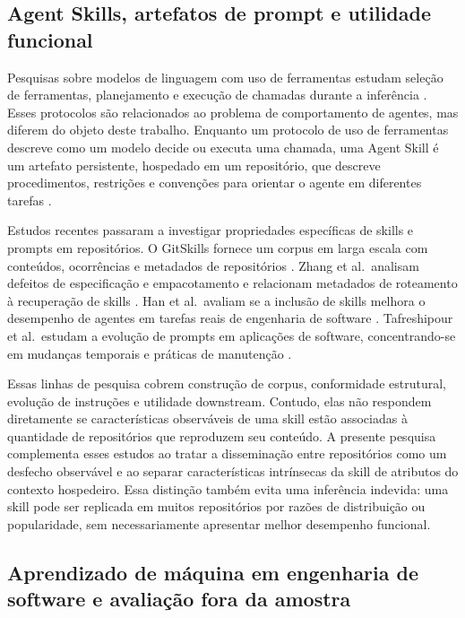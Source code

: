 \subsection{Agent Skills, artefatos de prompt e utilidade
funcional}\label{agent-skills-artefatos-de-prompt-e-utilidade-funcional}

Pesquisas sobre modelos de linguagem com uso de ferramentas estudam
seleção de ferramentas, planejamento e execução de chamadas durante a
inferência
\cite{schick2023toolformer,shen2023hugginggpt,yao2023react,qin2023toolllm}.
Esses protocolos são relacionados ao problema de comportamento de
agentes, mas diferem do objeto deste trabalho. Enquanto um protocolo de
uso de ferramentas descreve como um modelo decide ou executa uma
chamada, uma Agent Skill é um artefato persistente, hospedado em um
repositório, que descreve procedimentos, restrições e convenções para
orientar o agente em diferentes tarefas \cite{agentskills_spec}.

Estudos recentes passaram a investigar propriedades específicas de
skills e prompts em repositórios. O GitSkills fornece um corpus em larga
escala com conteúdos, ocorrências e metadados de repositórios
\cite{gitskills2027}. Zhang et al.~analisam defeitos de especificação e
empacotamento e relacionam metadados de roteamento à recuperação de
skills \cite{zhang2026keepskillsreuse}. Han et al.~avaliam se a inclusão
de skills melhora o desempenho de agentes em tarefas reais de engenharia
de software \cite{han2026sweskillsbench}. Tafreshipour et al.~estudam a
evolução de prompts em aplicações de software, concentrando-se em
mudanças temporais e práticas de manutenção
\cite{tafreshipour2025prompting}.

Essas linhas de pesquisa cobrem construção de corpus, conformidade
estrutural, evolução de instruções e utilidade downstream. Contudo, elas
não respondem diretamente se características observáveis de uma skill
estão associadas à quantidade de repositórios que reproduzem seu
conteúdo. A presente pesquisa complementa esses estudos ao tratar a
disseminação entre repositórios como um desfecho observável e ao separar
características intrínsecas da skill de atributos do contexto
hospedeiro. Essa distinção também evita uma inferência indevida: uma
skill pode ser replicada em muitos repositórios por razões de
distribuição ou popularidade, sem necessariamente apresentar melhor
desempenho funcional.

\subsection{Aprendizado de máquina em engenharia de software e avaliação
fora da
amostra}\label{aprendizado-de-muxe1quina-em-engenharia-de-software-e-avaliauxe7uxe3o-fora-da-amostra}


